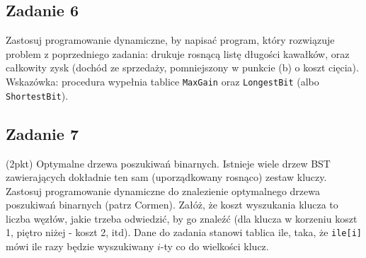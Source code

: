 \documentclass{article}
\begin{document}
\subsection*{Zadanie 6}
Zastosuj programowanie dynamiczne, by napisać program, który rozwiązuje problem
z poprzedniego zadania: drukuje rosnącą listę długości kawałków, oraz całkowity zysk
(dochód ze sprzedaży, pomniejszony w punkcie (b) o koszt cięcia).
Wskazówka: procedura wypełnia tablice \verb|MaxGain| oraz \verb|LongestBit| (albo \verb|ShortestBit|).

\subsection*{Zadanie 7}
(2pkt) Optymalne drzewa poszukiwań binarnych. Istnieje wiele drzew BST zawierających
dokładnie ten sam (uporządkowany rosnąco) zestaw kluczy. Zastosuj programowanie
dynamiczne do znalezienie optymalnego drzewa poszukiwań binarnych (patrz Cormen).
Załóż, że koszt wyszukania klucza to liczba węzłów, jakie trzeba odwiedzić, by go
znaleźć (dla klucza w korzeniu koszt 1, piętro niżej - koszt 2, itd). Dane do zadania stanowi
tablica ile, taka, że \verb|ile[i]| mówi ile razy będzie wyszukiwany $i$-ty co do wielkości klucz.
\end{document}
